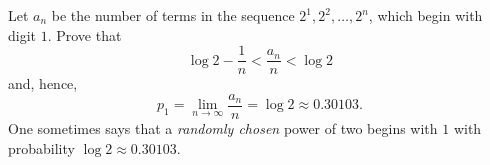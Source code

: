 Let $a_n$ be the number of terms in the sequence $2^1, 2^2, \ldots, 2^n$, which begin with digit $1$. Prove that
\[ \log 2 - \frac{1}{n} < \frac{a_n}{n} < \log 2 \]
and, hence,
\[ p_1 = \lim_{n\to\infty} \frac{a_n}{n} = \log 2 \approx 0.30103. \]
One sometimes says that a \emph{randomly chosen} power of two begins with $1$ with probability $\log 2 \approx 0.30103$.
